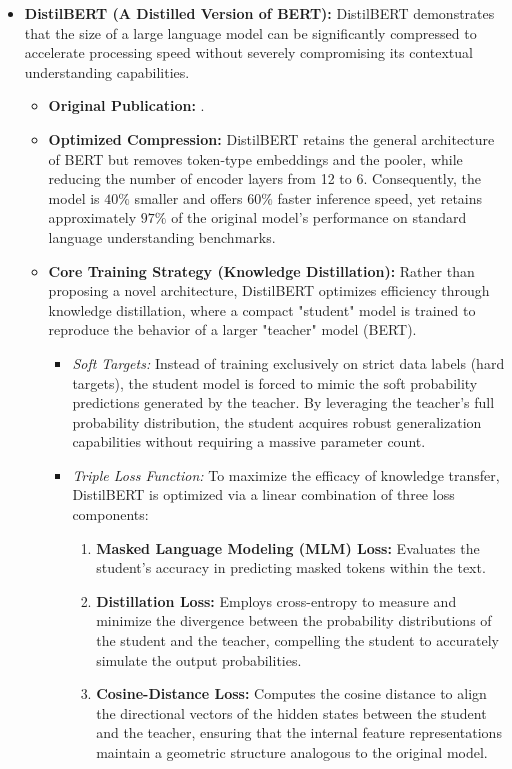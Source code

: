 \begin{itemize}
	\vspace{0.2cm}
	\item \textbf{DistilBERT (A Distilled Version of BERT):} DistilBERT demonstrates that the size of a large language model can be significantly compressed to accelerate processing speed without severely compromising its contextual understanding capabilities.
	\begin{itemize}
		\item \textbf{Original Publication:} \cite{sanh2019distilbert}.
		\item \textbf{Optimized Compression:} DistilBERT retains the general architecture of BERT but removes token-type embeddings and the pooler, while reducing the number of encoder layers from 12 to 6. Consequently, the model is $40\%$ smaller and offers $60\%$ faster inference speed, yet retains approximately $97\%$ of the original model's performance on standard language understanding benchmarks.
		\item \textbf{Core Training Strategy (Knowledge Distillation):} Rather than proposing a novel architecture, DistilBERT optimizes efficiency through knowledge distillation, where a compact "student" model is trained to reproduce the behavior of a larger "teacher" model (BERT).
		\begin{itemize}
			\item \textit{Soft Targets:} Instead of training exclusively on strict data labels (hard targets), the student model is forced to mimic the soft probability predictions generated by the teacher. By leveraging the teacher's full probability distribution, the student acquires robust generalization capabilities without requiring a massive parameter count.
			\item \textit{Triple Loss Function:} To maximize the efficacy of knowledge transfer, DistilBERT is optimized via a linear combination of three loss components:
			\begin{enumerate}
				\item \textbf{Masked Language Modeling (MLM) Loss:} Evaluates the student's accuracy in predicting masked tokens within the text.
				\item \textbf{Distillation Loss:} Employs cross-entropy to measure and minimize the divergence between the probability distributions of the student and the teacher, compelling the student to accurately simulate the output probabilities.
				\item \textbf{Cosine-Distance Loss:} Computes the cosine distance to align the directional vectors of the hidden states between the student and the teacher, ensuring that the internal feature representations maintain a geometric structure analogous to the original model.
			\end{enumerate}
		\end{itemize}
	\end{itemize}
	

\end{itemize}
